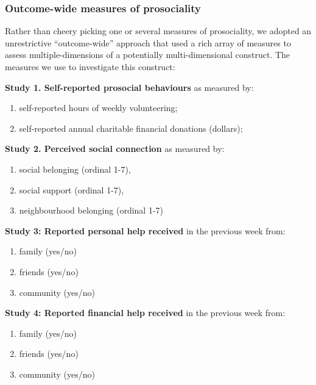 \documentclass[
  singlecolumn]{article}
\providecommand{\tightlist}{%
  \setlength{\itemsep}{0pt}\setlength{\parskip}{0pt}}\usepackage{longtable,booktabs,array}
\begin{document}
\subsubsection{Outcome-wide measures of
prosociality}\label{outcome-wide-measures-of-prosociality}

Rather than cheery picking one or several measures of prosociality, we
adopted an unrestrictive ``outcome-wide'' approach that used a rich
array of measures to assess multiple-dimensions of a potentially
multi-dimensional construct. The measures we use to investigate this
construct:

\textbf{Study 1. Self-reported prosocial behaviours} as measured by:

\begin{enumerate}
\def\labelenumi{(\alph{enumi})}
\tightlist
\item
  self-reported hours of weekly volunteering;
\item
  self-reported annual charitable financial donations (dollars);
\end{enumerate}

\textbf{Study 2. Perceived social connection} as measured by:

\begin{enumerate}
\def\labelenumi{(\alph{enumi})}
\tightlist
\item
  social belonging (ordinal 1-7),
\item
  social support (ordinal 1-7),
\item
  neighbourhood belonging (ordinal 1-7)
\end{enumerate}

\textbf{Study 3: Reported personal help received} in the previous week
from:

\begin{enumerate}
\def\labelenumi{(\alph{enumi})}
\tightlist
\item
  family (yes/no)
\item
  friends (yes/no)
\item
  community (yes/no)
\end{enumerate}

\textbf{Study 4: Reported financial help received} in the previous week
from:

\begin{enumerate}
\def\labelenumi{(\alph{enumi})}
\tightlist
\item
  family (yes/no)
\item
  friends (yes/no)
\item
  community (yes/no)
\end{enumerate}
\end{document}
